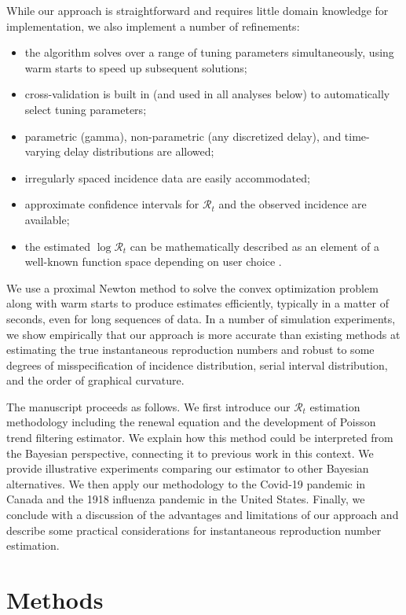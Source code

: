 \documentclass[10pt,letterpaper]{article}
\def\calR{\mathcal{R}}
\begin{document}
While our approach is straightforward and requires little domain knowledge for
implementation, we also implement a number of refinements:
\begin{itemize}
  \item the algorithm solves over a range of tuning parameters simultaneously,
  using warm starts to speed up subsequent solutions;
  \item cross-validation is built in (and used in all analyses below) to
  automatically select tuning parameters;
  \item parametric (gamma), non-parametric (any discretized delay), and
  time-varying delay distributions are allowed;
  \item irregularly spaced incidence data are easily accommodated;
  \item approximate confidence intervals for $\calR_t$ and the observed
  incidence are available;
  \item the estimated $\log\calR_t$ can be mathematically described as an
  element of a well-known function space depending on user choice \cite{tibshirani2022divided}.
\end{itemize}
We use a proximal Newton method to solve the convex optimization problem along
with warm starts to produce estimates efficiently, typically in a matter of
seconds, even for long sequences of data. In a number of simulation experiments,
we show empirically that our approach is more accurate than existing methods at
estimating the true instantaneous reproduction numbers and robust to some
degrees of misspecification of incidence distribution, serial interval
distribution, and the order of graphical curvature. 


The manuscript proceeds as follows. We first introduce our $\calR_t$
estimation methodology including the renewal equation and the development of
Poisson trend filtering estimator. We explain how this method could be
interpreted from the Bayesian perspective, connecting it to previous work in
this context. We provide illustrative experiments comparing our estimator to
other Bayesian alternatives. We then apply our methodology to the Covid-19
pandemic in Canada and the 1918 influenza pandemic in the United States.
Finally, we conclude with a discussion of the advantages and limitations of our
approach and describe some practical considerations for instantaneous
reproduction number estimation.


\section{Methods}
\end{document}
